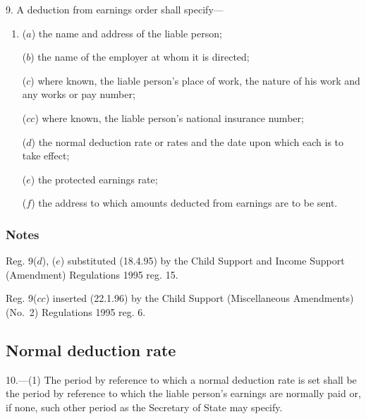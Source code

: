 \documentclass[a4paper]{article}
\newcommand\amendment[1]{\subsubsection*{Notes}{\itshape\frenchspacing\footnotesize #1 \par}}
\begin{document}
9.  A deduction from earnings order shall specify—
\begin{enumerate}\item[]
($a$) the name and address of the liable person;

($b$) the name of the employer at whom it is directed;

($c$) where known, the liable person’s place of work, the nature of his work and any works or pay number;

($cc$) where known, the liable person’s national insurance number;

%

($d$) the normal deduction rate or rates and the date upon which each is to take effect;

($e$) the protected earnings rate;

($f$) the address to which amounts deducted from earnings are to be sent.
\end{enumerate}

\amendment{

Reg. 9($d$), ($e$) substituted (18.4.95) by the Child Support and Income Support (Amendment) Regulations 1995 reg. 15.

Reg. 9($cc$) inserted (22.1.96) by the Child Support (Miscellaneous Amendments) (No.\ 2) Regulations 1995 reg. 6.
}

\subsection[10. Normal deduction rate]{Normal deduction rate}

10.—(1) The period by reference to which 
a normal deduction rate  %
is set shall be the period by reference to which the liable person’s earnings are normally paid or, if none, such other period as the Secretary of State may specify.
\end{document}
